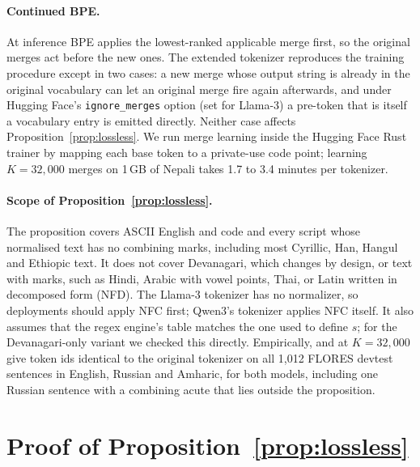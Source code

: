 \paragraph{Continued BPE.} At inference BPE applies the lowest-ranked applicable merge first, so the original merges act before the new ones. The extended tokenizer reproduces the training procedure except in two cases: a new merge whose output string is already in the original vocabulary can let an original merge fire again afterwards, and under Hugging Face's \texttt{ignore\_merges} option (set for Llama-3) a pre-token that is itself a vocabulary entry is emitted directly. Neither case affects Proposition~\ref{prop:lossless}. We run merge learning inside the Hugging Face Rust trainer by mapping each base token to a private-use code point; learning $K{=}32{,}000$ merges on 1\,GB of Nepali takes 1.7 to 3.4 minutes per tokenizer.

\paragraph{Scope of Proposition~\ref{prop:lossless}.} The proposition covers ASCII English and code and every script whose normalised text has no combining marks, including most Cyrillic, Han, Hangul and Ethiopic text. It does not cover Devanagari, which changes by design, or text with marks, such as Hindi, Arabic with vowel points, Thai, or Latin written in decomposed form (NFD). The Llama-3 tokenizer has no normalizer, so deployments should apply NFC first; Qwen3's tokenizer applies NFC itself. It also assumes that the regex engine's \pM{} table matches the one used to define $s$; for the Devanagari-only variant we checked this directly. Empirically, \RI{} and \RII{} at $K{=}32{,}000$ give token ids identical to the original tokenizer on all 1{,}012 FLORES devtest sentences in English, Russian and Amharic, for both models, including one Russian sentence with a combining acute that lies outside the proposition.

\section{Proof of Proposition~\ref{prop:lossless}}
\label{app:proof}

